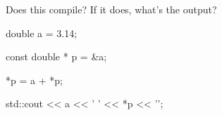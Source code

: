 Does this compile? If it does, what's the output?



\begin{consolethree}[escapeinside=||]

double a = 3.14;

const double * p = &a;

*p = a + *p;



std::cout << a << ' ' << *p << '\n';

\end{consolethree}

